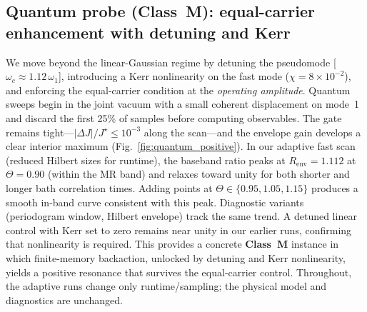 \documentclass[11pt,letterpaper]{article}
\DeclareRobustCommand{\classM}{\textbf{Class~M}\xspace}
\begin{document}
\subsection{Quantum probe (\classM): equal-carrier enhancement with detuning and Kerr}
We move beyond the linear-Gaussian regime by detuning the pseudomode [$\omega_c\approx1.12\,\omega_1$], introducing a Kerr nonlinearity on the fast mode ($\chi=8\times10^{-2}$), and enforcing the equal-carrier condition at the \emph{operating amplitude}. Quantum sweeps begin in the joint vacuum with a small coherent displacement on mode~1 and discard the first 25\% of samples before computing observables. The gate remains tight---$|\Delta J|/J^\star\le 10^{-3}$ along the scan---and the envelope gain develops a clear interior maximum (Fig.~\ref{fig:quantum_positive}). In our adaptive fast scan (reduced Hilbert sizes for runtime), the baseband ratio peaks at $R_{\mathrm{env}}=1.112$ at $\Theta=0.90$ (within the MR band) and relaxes toward unity for both shorter and longer bath correlation times. Adding points at $\Theta\in\{0.95,1.05,1.15\}$ produces a smooth in-band curve consistent with this peak. Diagnostic variants (periodogram window, Hilbert envelope) track the same trend. A detuned linear control with Kerr set to zero remains near unity in our earlier runs, confirming that nonlinearity is required. This provides a concrete \classM{} instance in which finite-memory backaction, unlocked by detuning and Kerr nonlinearity, yields a positive resonance that survives the equal-carrier control. Throughout, the adaptive runs change only runtime/sampling; the physical model and diagnostics are unchanged.
\end{document}
